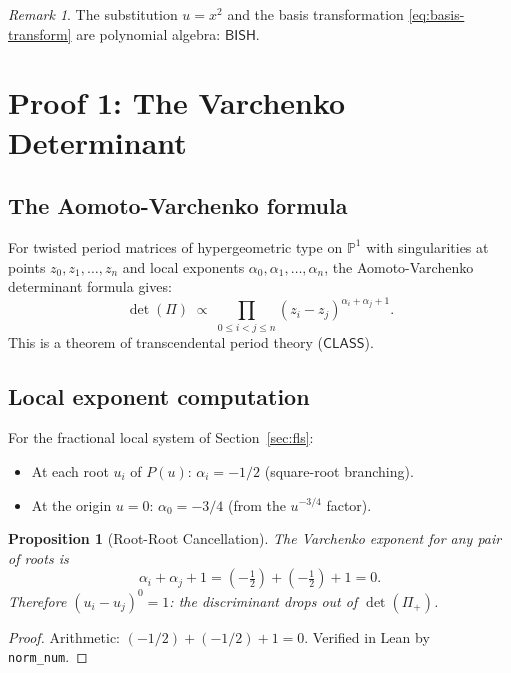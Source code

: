 \documentclass[11pt]{article}
\theoremstyle{plain}
\newtheorem{proposition}[theorem]{Proposition}
\theoremstyle{definition}
\theoremstyle{remark}
\newtheorem{remark}[theorem]{Remark}
\newcommand{\PP}{\mathbb{P}}
\newcommand{\BISH}{\mathsf{BISH}}
\newcommand{\CLASS}{\mathsf{CLASS}}
\begin{document}
\begin{remark}
  The substitution $u = x^2$ and the basis transformation
  \eqref{eq:basis-transform} are polynomial algebra: $\BISH$.
\end{remark}


\section{Proof 1: The Varchenko Determinant}\label{sec:proof1}

\subsection{The Aomoto-Varchenko formula}

For twisted period matrices of hypergeometric type on $\PP^1$ with
singularities at points $z_0, z_1, \ldots, z_n$ and local exponents
$\alpha_0, \alpha_1, \ldots, \alpha_n$, the Aomoto-Varchenko determinant
formula \cite{aomoto,varchenko} gives:
\begin{equation}\label{eq:varchenko}
  \det(\Pi) \;\propto\;
  \prod_{0 \leq i < j \leq n} (z_i - z_j)^{\alpha_i + \alpha_j + 1}.
\end{equation}
This is a theorem of transcendental period theory ($\CLASS$).

\subsection{Local exponent computation}

For the fractional local system of Section~\ref{sec:fls}:
\begin{itemize}
  \item At each root $u_i$ of $P(u)$: $\alpha_i = -1/2$ (square-root branching).
  \item At the origin $u = 0$: $\alpha_0 = -3/4$ (from the $u^{-3/4}$ factor).
\end{itemize}

\begin{proposition}[Root-Root Cancellation]\label{prop:rr}
  The Varchenko exponent for any pair of roots is
  \[
    \alpha_i + \alpha_j + 1 = (-\tfrac{1}{2}) + (-\tfrac{1}{2}) + 1 = 0.
  \]
  Therefore $(u_i - u_j)^0 = 1$: the discriminant drops out of $\det(\Pi_+)$.
\end{proposition}

\begin{proof}
  Arithmetic: $(-1/2) + (-1/2) + 1 = 0$.  Verified in Lean by \texttt{norm\_num}.
\end{proof}
\end{document}
